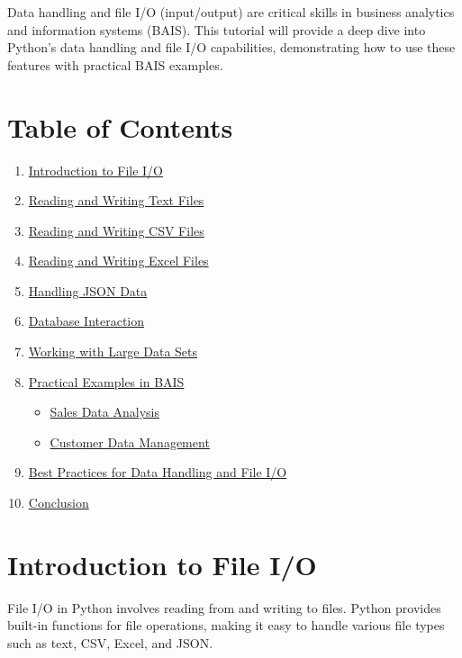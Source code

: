 \documentclass[
  letterpaper,
  DIV=11,
  numbers=noendperiod]{scrreprt}
\providecommand{\tightlist}{%
  \setlength{\itemsep}{0pt}\setlength{\parskip}{0pt}}\usepackage{longtable,booktabs,array}
\begin{document}
Data handling and file I/O (input/output) are critical skills in
business analytics and information systems (BAIS). This tutorial will
provide a deep dive into Python's data handling and file I/O
capabilities, demonstrating how to use these features with practical
BAIS examples.

\section{Table of Contents}\label{table-of-contents-4}

\begin{enumerate}
\def\labelenumi{\arabic{enumi}.}
\tightlist
\item
  \hyperref[introduction-to-file-i-o]{Introduction to File I/O}
\item
  \hyperref[reading-and-writing-text-files]{Reading and Writing Text
  Files}
\item
  \hyperref[reading-and-writing-csv-files]{Reading and Writing CSV
  Files}
\item
  \hyperref[reading-and-writing-excel-files]{Reading and Writing Excel
  Files}
\item
  \hyperref[handling-json-data]{Handling JSON Data}
\item
  \hyperref[database-interaction]{Database Interaction}
\item
  \hyperref[working-with-large-data-sets]{Working with Large Data Sets}
\item
  \hyperref[practical-examples-in-bais]{Practical Examples in BAIS}

  \begin{itemize}
  \tightlist
  \item
    \hyperref[sales-data-analysis]{Sales Data Analysis}
  \item
    \hyperref[customer-data-management]{Customer Data Management}
  \end{itemize}
\item
  \hyperref[best-practices-for-data-handling-and-file-i-o]{Best
  Practices for Data Handling and File I/O}
\item
  \hyperref[conclusion]{Conclusion}
\end{enumerate}

\section{Introduction to File I/O}\label{introduction-to-file-io}

File I/O in Python involves reading from and writing to files. Python
provides built-in functions for file operations, making it easy to
handle various file types such as text, CSV, Excel, and JSON.
\end{document}
